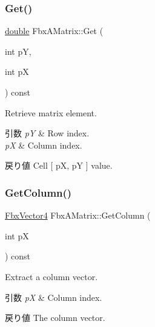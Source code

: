 \mbox{\label{class_fbx_a_matrix_ac3271d21b23683864a324ad93c860aad}} 
\subsubsection{\texorpdfstring{Get()}{Get()}}
{\footnotesize\ttfamily \hyperlink{class_fbx_a_matrix_ad463edbb9fea344643297701f159faa7}{double} Fbx\+A\+Matrix\+::\+Get (\begin{DoxyParamCaption}\item[{int}]{pY,  }\item[{int}]{pX }\end{DoxyParamCaption}) const}

Retrieve matrix element. 
\begin{DoxyParams}{引数}
{\em pY} & Row index. \\
\hline
{\em pX} & Column index. \\
\hline
\end{DoxyParams}
\begin{DoxyReturn}{戻り値}
Cell \mbox{[} pX, pY \mbox{]} value. 
\end{DoxyReturn}
\mbox{\label{class_fbx_a_matrix_a73d4fbefc0fa5888553d3e7e0784e971}} 
\subsubsection{\texorpdfstring{Get\+Column()}{GetColumn()}}
{\footnotesize\ttfamily \hyperlink{class_fbx_vector4}{Fbx\+Vector4} Fbx\+A\+Matrix\+::\+Get\+Column (\begin{DoxyParamCaption}\item[{int}]{pX }\end{DoxyParamCaption}) const}

Extract a column vector. 
\begin{DoxyParams}{引数}
{\em pX} & Column index. \\
\hline
\end{DoxyParams}
\begin{DoxyReturn}{戻り値}
The column vector. 
\end{DoxyReturn}
\mbox{\label{class_fbx_a_matrix_ad65916a52b30b14175213b24111e845b}} 
